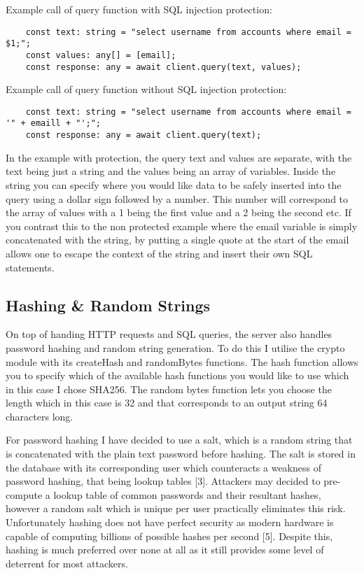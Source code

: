 \documentclass[]{final_report}
\begin{document}
Example call of query function with SQL injection protection:

\begin{verbatim}
    const text: string = "select username from accounts where email = $1;";
    const values: any[] = [email];
    const response: any = await client.query(text, values);
\end{verbatim}

Example call of query function without SQL injection protection:

\begin{verbatim}
    const text: string = "select username from accounts where email = '" + emaill + "';";
    const response: any = await client.query(text);
\end{verbatim}

In the example with protection, the query text and values are separate, with the text being just a string and the values being an array of variables. Inside the string you can specify where you would like data to be safely inserted into the query using a dollar sign followed by a number. This number will correspond to the array of values with a 1 being the first value and a 2 being the second etc. If you contrast this to the non protected example where the email variable is simply concatenated with the string, by putting a single quote at the start of the email allows one to escape the context of the string and insert their own SQL statements. 

\subsection{Hashing \& Random Strings}

On top of handing HTTP requests and SQL queries, the server also handles password hashing and random string generation. To do this I utilise the crypto module with its createHash and randomBytes functions. The hash function allows you to specify which of the available hash functions you would like to use which in this case I chose SHA256. The random bytes function lets you choose the length which in this case is 32 and that corresponds to an output string 64 characters long.

\newpage
For password hashing I have decided to use a salt, which is a random string that is concatenated with the plain text password before hashing. The salt is stored in the database with its corresponding user which counteracts a weakness of password hashing, that being lookup tables [3]. Attackers may decided to pre-compute a lookup table of common passwords and their resultant hashes, however a random salt which is unique per user practically eliminates this risk. Unfortunately hashing does not have perfect security as modern hardware is capable of computing billions of possible hashes per second [5]. Despite this, hashing is much preferred over none at all as it still provides some level of deterrent for most attackers.
\end{document}
